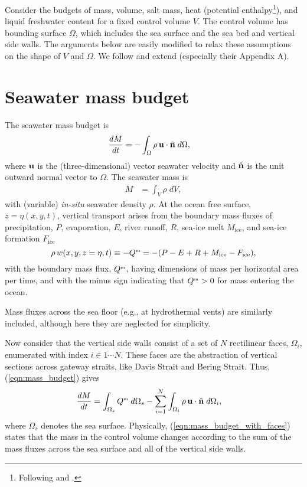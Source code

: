 \documentclass[10pt]{amsart}
\newcommand{\Qm}{Q^{\mbox{\tiny m}}}
\newcommand{\surf}{\Omega}
\begin{document}
Consider the budgets of mass, volume, salt mass, heat (potential enthalpy\footnote{Following \cite{mcdougall03} and \cite{ioc10}.}), and liquid freshwater content for a fixed control volume $V$.
The control volume has bounding surface $\surf$, which includes the sea surface and the sea bed and vertical side walls. 
The arguments below are easily modified to relax these assumptions on the shape of $V$ and $\surf$.
We follow and extend \cite{mcdonagh_etal} (especially their Appendix A).

\section{Seawater mass budget}
\label{sect:mass}
The seawater mass budget is
\begin{align}
\frac{d M}{d t} & = - \int_\surf \rho \, {\bf u} \cdot {\hat{\bf n}} \; d \surf ,
\label{eqn:mass_budget}
\end{align}
where ${\bf u}$ is the (three-dimensional) vector seawater velocity and ${\hat{\bf n}}$ is the unit outward normal vector to $\surf$.
The seawater mass is 
\begin{align}
M & = \int_V \rho \; d V ,
\end{align}
with (variable) {\it in-situ} seawater density $\rho$.
At the ocean free surface, $z = \eta(x,y,t)$, vertical transport arises from the boundary mass fluxes of precipitation, $P$, evaporation, $E$, river runoff, $R$, sea-ice melt  $M_\mathrm{ice}$, and sea-ice formation $F_\mathrm{ice}$
\begin{equation}
 \rho \, w(x, y, z = \eta, t) \equiv -\Qm  = -(P-E+R+M_\mathrm{ice} - F_\mathrm{ice}),
\label{eqn:surface-mass-fluxes}
\end{equation}
with the boundary mass flux, $\Qm$, having dimensions of mass per horizontal area per time, and with the minus sign indicating that $\Qm >0$ for mass entering the ocean. 

Mass fluxes across the sea floor (e.g., at hydrothermal vents) are similarly included, although here they are neglected for simplicity.

Now consider that the vertical side walls consist of a set of $N$ rectilinear faces, $\surf_i$, enumerated with index $i \in 1 \cdots N$.
These faces are the abstraction of vertical sections across gateway straits, like Davis Strait and Bering Strait.
Thus, (\ref{eqn:mass_budget}) gives
\begin{align}
\frac{d M}{d t} & = \int_{\surf_s} \Qm \; d\surf_s  - \sum_{i=1}^N \int_{\surf_i} \rho \, {\bf u} \cdot {\hat{\bf n}}  \; d \surf_i ,
\label{eqn:mass_budget_with_faces}
\end{align}
where $\surf_s$ denotes the sea surface.
Physically, (\ref{eqn:mass_budget_with_faces}) states that the mass in the control volume changes according to the sum of the mass fluxes across the sea surface and all of the vertical side walls.
\end{document}
